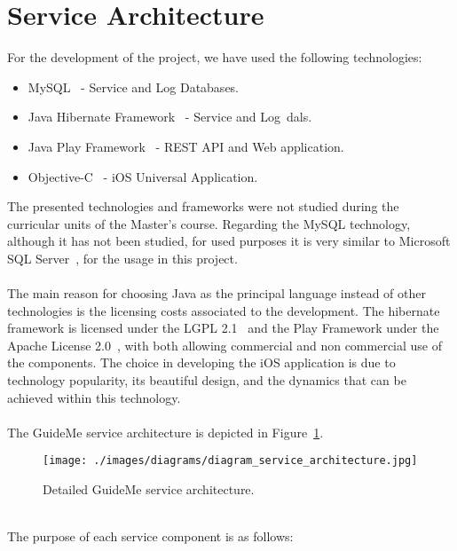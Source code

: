 \section{Service Architecture}
\label{subsubsec:service-architecture}
For the development of the project, we have used the following technologies:
\begin{itemize}
  \item MySQL~\cite{MySqlOrcale} - Service and Log Databases.
  \item Java Hibernate Framework~\cite{hibernate} - Service and Log~\gls{dal}s.
  \item Java Play Framework~\cite{playFramework} - REST API and Web application.
  \item Objective-C~\cite{ObjectiveC} - iOS Universal Application.
\end{itemize}
The presented technologies and frameworks were not studied during the curricular units of the Master's course. Regarding the MySQL technology, although it has not been studied, for used purposes it is very similar to Microsoft SQL Server~\cite{msSqlServer}, for the usage in this project.\\
\\
The main reason for choosing Java as the principal language instead of other technologies is the licensing costs associated to the development. The hibernate framework is licensed under the LGPL 2.1~\cite{licenseLGPG} and the Play Framework under the Apache License 2.0~\cite{licenseApacheV2}, with both allowing commercial and non commercial use of the components. The choice in developing the iOS application is due to technology popularity, its beautiful design, and the dynamics that can be achieved within this technology.\\
\\
\newpage
The GuideMe service architecture is depicted in Figure~\ref{fig:serviceArchitecture}.\\
\begin{figure}[h!]
 \centering
   \texttt{[image: ./images/diagrams/diagram\_service\_architecture.jpg]}
   \caption{Detailed GuideMe service architecture.}
   \label{fig:serviceArchitecture}
\end{figure}\\
The purpose of each service component is as follows:
